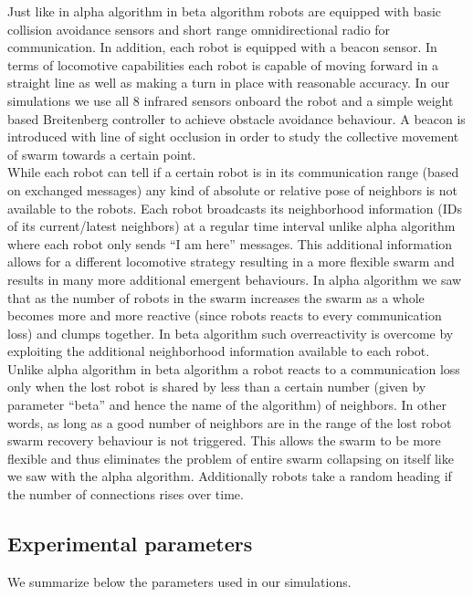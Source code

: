 \documentclass[a4paper, 10pt, conference]{ieeeconf}
\begin{document}
  Just like in alpha algorithm in beta algorithm robots are equipped with basic collision avoidance sensors and short range omnidirectional radio for communication. In addition, each robot is equipped with a beacon sensor. In terms of locomotive capabilities each robot is capable of moving forward in a straight line as well as making a turn in place with reasonable accuracy. In our simulations we use all 8 infrared sensors onboard the robot and a simple weight based Breitenberg controller to achieve obstacle avoidance behaviour. A beacon is introduced with line of sight occlusion in order to study the collective movement of swarm towards a certain point.\\

  While each robot can tell if a certain robot is in its communication range (based on exchanged messages) any kind of absolute or relative pose of neighbors is not available to the robots. Each robot broadcasts its neighborhood information (IDs of its current/latest neighbors) at a regular time interval unlike alpha algorithm where each robot only sends ``I am here'' messages. This additional information allows for a different locomotive strategy resulting in a more flexible swarm and results in many more additional emergent behaviours. In alpha algorithm we saw that as the number of robots in the swarm increases the swarm as a whole becomes more and more reactive (since robots reacts to every communication loss) and clumps together. In beta algorithm such overreactivity is overcome by exploiting the additional neighborhood information available to each robot. Unlike alpha algorithm in beta algorithm a robot reacts to a communication loss only when the lost robot is shared by less than a certain number (given by parameter ``beta'' and hence the name of the algorithm) of neighbors. In other words, as long as a good number of neighbors are in the range of the lost robot swarm recovery behaviour is not triggered. This allows the swarm to be more flexible and thus eliminates the problem of entire swarm collapsing on itself like we saw with the alpha algorithm. Additionally robots take a random heading if the number of connections rises over time.\\



  \subsection{Experimental parameters}
  We summarize below the parameters used in our simulations.
\end{document}
